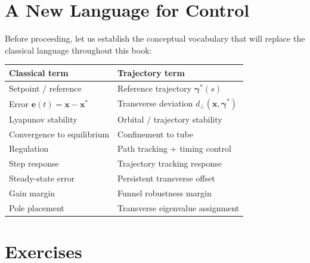 \documentclass[12pt, openany]{book}
\theoremstyle{plain}
\newcommand{\state}{\bm{x}}
\newcommand{\traj}{\bm{\gamma}}
\begin{document}
\section{A New Language for Control}

Before proceeding, let us establish the conceptual vocabulary that will replace
the classical language throughout this book:

\begin{center}
\renewcommand{\arraystretch}{1.4}
\begin{tabular}{@{} l @{\qquad$\longrightarrow$\qquad} l @{}}
  \textbf{\color{gray}Classical term} & \textbf{\color{chapblue}Trajectory term} \\
  \hline
  Setpoint / reference & Reference trajectory $\traj^*(s)$ \\
  Error $\bm{e}(t) = \state - \state^*$ & Transverse deviation $d_\perp(\state, \traj^*)$ \\
  Lyapunov stability & Orbital / trajectory stability \\
  Convergence to equilibrium & Confinement to tube \\
  Regulation & Path tracking + timing control \\
  Step response & Trajectory tracking response \\
  Steady-state error & Persistent transverse offset \\
  Gain margin & Funnel robustness margin \\
  Pole placement & Transverse eigenvalue assignment \\
\end{tabular}
\end{center}

\vspace{0.5cm}

\section{Exercises}
\end{document}
